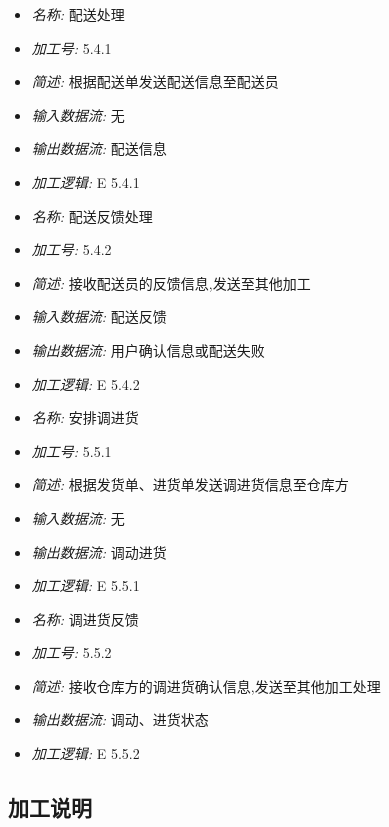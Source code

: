 \documentclass{article}
\begin{document}
\begin{CJK*}{UTF8}{gbsn}
\begin{itemize}
\item \textit{名称: }配送处理
\item \textit{加工号: }5.4.1
\item \textit{简述: } 根据配送单发送配送信息至配送员 
\item \textit{输入数据流: } 无
\item \textit{输出数据流: } 配送信息
\item \textit{加工逻辑: } E 5.4.1

\end{itemize}


\vspace{-1mm}


\begin{itemize}
\item \textit{名称: }配送反馈处理
\item \textit{加工号: }5.4.2
\item \textit{简述: } 接收配送员的反馈信息,发送至其他加工 
\item \textit{输入数据流: } 配送反馈
\item \textit{输出数据流: } 用户确认信息或配送失败 
\item \textit{加工逻辑: } E 5.4.2

\end{itemize}


\vspace{-1mm}


\begin{itemize}
\item \textit{名称: }安排调进货
\item \textit{加工号: }5.5.1
\item \textit{简述: } 根据发货单、进货单发送调进货信息至仓库方 
\item \textit{输入数据流: } 无
\item \textit{输出数据流: } 调动进货
\item \textit{加工逻辑: } E 5.5.1

\end{itemize}


\vspace{-1mm}


\begin{itemize}
\item \textit{名称: }调进货反馈
\item \textit{加工号: }5.5.2
\item \textit{简述: } 接收仓库方的调进货确认信息,发送至其他加工处理 
\item \textit{输出数据流: } 调动、进货状态
\item \textit{加工逻辑: } E 5.5.2

\end{itemize}


\vspace{-1mm}

\subsection{加工说明}
\end{CJK*}
\end{document}

